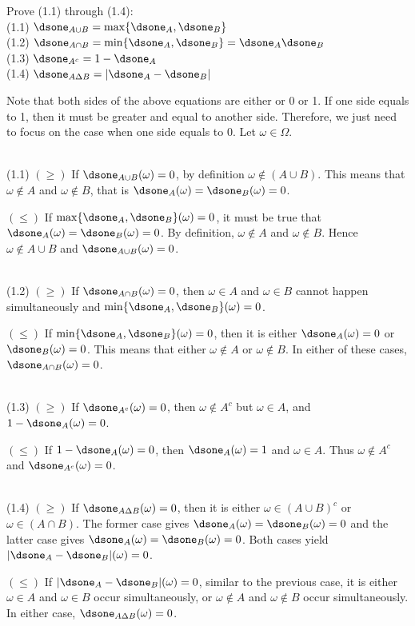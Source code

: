 \begin{exercise}
  Prove (1.1) through (1.4): \\
  (1.1) $\dsone_{A \cup B} = \max \{ \dsone_A, \dsone_B \}$ \\
  (1.2) $\dsone_{A \cap B} = \min \{ \dsone_A, \dsone_B \}  = \dsone_A \dsone_B$ \\
  (1.3) $\dsone_{A^c} = 1 - \dsone_A$ \\
  (1.4) $\dsone_{A \Delta B} = |\dsone_A - \dsone_B|$
\end{exercise}
\begin{solution}
  Note that both sides of the above equations are either or 0 or 1. If one side equals to 1, then it must be greater and equal to another side. Therefore, we just need to focus on the case when one side equals to 0. Let $\omega \in\Omega$.

  ~\\ (1.1) $(\geq)$ If $\dsone_{A \cup B}(\omega) = 0$, by definition $\omega\notin (A\cup B)$. This means that $\omega\notin A$ and $\omega\notin B$, that is $\dsone_A(\omega) = \dsone_B(\omega) = 0$.

  $(\leq)$ If $\max \{ \dsone_A, \dsone_B \} (\omega) = 0$, it must be true that $\dsone_A(\omega)=\dsone_B(\omega)=0$. By definition, $\omega\notin A$ and $\omega\notin B$. Hence $\omega\notin A\cup B$ and $\dsone_{A \cup B}(\omega)=0$.

  ~\\ (1.2) $(\geq)$ If $\dsone_{A \cap B}(\omega)=0$, then $\omega\in A$ and $\omega\in B$ cannot happen simultaneously and $\min \{ \dsone_A, \dsone_B \} (\omega) = 0$.

  $(\leq)$ If $\min \{ \dsone_A, \dsone_B \} (\omega) = 0$, then it is either $\dsone_A(\omega)=0$ or $\dsone_B(\omega)=0$. This means that either $\omega\notin A$  or $\omega\notin B$. In either of these cases, $\dsone_{A \cap B}(\omega)=0$.

  ~\\ (1.3) $(\geq)$ If $\dsone_{A^c}(\omega) = 0$, then $\omega\notin A^c$ but $\omega\in A$, and $1-\dsone_{A}(\omega) = 0$.

  $(\leq)$ If $1 - \dsone_A(\omega) = 0$, then $\dsone_A(\omega)=1$ and $\omega\in A$. Thus $\omega\notin A^c$ and $\dsone_{A^c}(\omega)=0$.

  ~\\ (1.4) $(\geq)$ If $\dsone_{A \Delta B}(\omega)=0$, then it is either $\omega\in(A\cup B)^c$ or $\omega\in(A\cap B)$. The former case gives $\dsone_A(\omega)=\dsone_B(\omega)=0$ and the latter case gives $\dsone_A(\omega)=\dsone_B(\omega)=0$. Both cases yield $|\dsone_A-\dsone_B|(\omega)=0$.

  $(\leq)$ If $|\dsone_A-\dsone_B|(\omega)=0$, similar to the previous case, it is either $\omega\in A$ and $\omega\in B$ occur simultaneously, or $\omega\notin A$ and $\omega\notin B$ occur simultaneously. In either case, $\dsone_{A \Delta B}(\omega)=0$.
\end{solution}


